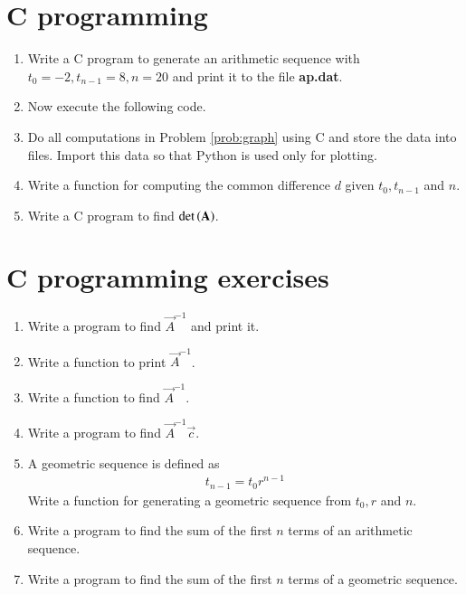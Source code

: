 \documentclass[journal,12pt,twocolumn]{IEEEtran}
\renewcommand\thesection{\arabic{section}}
\begin{document}
\section{C programming}
\begin{enumerate}[label=\thesection.\arabic*
,ref=\thesection.\theenumi]
\item Write a C program to generate an arithmetic sequence with $t_0 = -2, t_{n-1}= 8, n = 20$ and print it to 
the file \textbf{ap.dat}.
\\
\solution

\item Now execute the following code.

\item Do all computations in Problem \ref{prob:graph} using C and store the data into files.  Import this data 
so that Python is used only for plotting.
\item Write a function for computing the common difference $d$ given $t_0,t_{n-1}$ and $n$.
\\
\solution

\item Write a C program to find $\det\left(\mathbf{A}\right)$.
\\
\solution


\end{enumerate}
\section{C programming exercises}
\begin{enumerate}[label=\thesection.\arabic*
,ref=\thesection.\theenumi]
\item Write a program to find $\vec{A}^{-1}$ and print it.
\item Write a function to print $\vec{A}^{-1}$.
\item Write a function to find $\vec{A}^{-1}$.
\item Write a program to find $\vec{A}^{-1}\vec{c}$.
\item A geometric sequence is defined as
\begin{align}
\label{eq:geo}
t_{n-1} = t_0r^{n-1}
\end{align}
Write a function for generating a geometric sequence from $t_0, r$ and $n$.
\item Write a program to find the sum of the first  $n$ terms of an arithmetic sequence.
\item Write a program to find the sum of the first  $n$ terms of a geometric sequence.

\end{enumerate}
\end{document}
